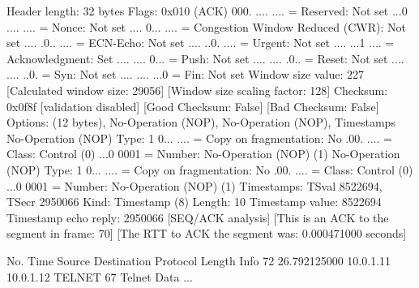     Header length: 32 bytes
    Flags: 0x010 (ACK)
        000. .... .... = Reserved: Not set
        ...0 .... .... = Nonce: Not set
        .... 0... .... = Congestion Window Reduced (CWR): Not set
        .... .0.. .... = ECN-Echo: Not set
        .... ..0. .... = Urgent: Not set
        .... ...1 .... = Acknowledgment: Set
        .... .... 0... = Push: Not set
        .... .... .0.. = Reset: Not set
        .... .... ..0. = Syn: Not set
        .... .... ...0 = Fin: Not set
    Window size value: 227
    [Calculated window size: 29056]
    [Window size scaling factor: 128]
    Checksum: 0x0f8f [validation disabled]
        [Good Checksum: False]
        [Bad Checksum: False]
    Options: (12 bytes), No-Operation (NOP), No-Operation (NOP), Timestamps
        No-Operation (NOP)
            Type: 1
                0... .... = Copy on fragmentation: No
                .00. .... = Class: Control (0)
                ...0 0001 = Number: No-Operation (NOP) (1)
        No-Operation (NOP)
            Type: 1
                0... .... = Copy on fragmentation: No
                .00. .... = Class: Control (0)
                ...0 0001 = Number: No-Operation (NOP) (1)
        Timestamps: TSval 8522694, TSecr 2950066
            Kind: Timestamp (8)
            Length: 10
            Timestamp value: 8522694
            Timestamp echo reply: 2950066
    [SEQ/ACK analysis]
        [This is an ACK to the segment in frame: 70]
        [The RTT to ACK the segment was: 0.000471000 seconds]

No.     Time           Source                Destination           Protocol Length Info
     72 26.792125000   10.0.1.11             10.0.1.12             TELNET   67     Telnet Data ...

